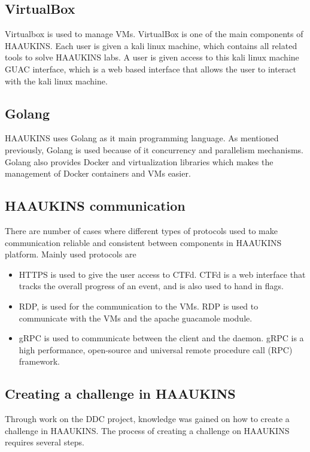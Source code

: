 \subsection{VirtualBox}
\label{sec:haaukins-virtualbox}
Virtualbox is used to manage \ac{VM}s. VirtualBox is one of the main components of \ac{HAAUKINS}.
Each user is given a kali linux machine, which contains all related tools to solve \ac{HAAUKINS} labs.
A user is given access to this kali linux machine \ac{GUAC}\cite{guacamole} interface, which is a web based interface
that allows the user to interact with the kali linux machine.

\subsection{\ac{Golang}}
\label{sec:haaukins-golang}
\ac{HAAUKINS} uses \ac{Golang} as it main programming language. As mentioned previously,
\ac{Golang} is used because of it concurrency and parallelism mechanisms. \ac{Golang} also 
provides Docker and virtualization libraries which makes the management of Docker containers and \ac{VM}s easier.

\subsection{HAAUKINS communication}
\label{sec:haaukins-communication}
There are number of cases where different types of protocols used to make communication reliable and consistent between components in \ac{HAAUKINS} platform. 
Mainly used protocols are\cite{haaukins-arch}
\begin{itemize}
    \item 
    \ac{HTTPS} is used to give the user access to CTFd. 
    CTFd is a web interface that tracks the overall progress of an event,
    and is also used to hand in flags.
    \item
    \ac{RDP}, is used for the communication to the \ac{VM}s. \ac{RDP} is used to communicate with the \ac{VM}s and the apache guacamole module.
    \item 
    \ac{gRPC} is used to communicate between the client and the daemon. \ac{gRPC} is a high performance, open-source and universal remote procedure call (RPC) framework.
\end{itemize}

\subsection{Creating a challenge in HAAUKINS}
\label{sec:haaukins-creating-challenge}
Through work on the \ac{DDC} project, knowledge was gained on how to create a challenge in \ac{HAAUKINS}. 
The process of creating a challenge on \ac{HAAUKINS} requires several steps.\cite{haaukins-challenge}

